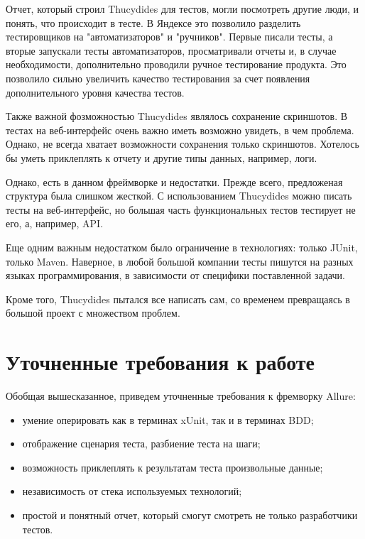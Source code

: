 Отчет, который строил Thucydides для тестов, могли посмотреть другие люди, и понять, что происходит в тесте. В Яндексе это позволило разделить тестировщиков на "автоматизаторов" и "ручников". Первые писали тесты, а вторые запускали тесты автоматизаторов, просматривали отчеты и, в случае необходимости, дополнительно проводили ручное тестирование продукта. Это позволило сильно увеличить качество тестирования за счет появления дополнительного уровня качества тестов.

Также важной фозможностью Thucydides являлось сохранение скриншотов. В тестах на веб-интерфейс очень важно иметь возможно увидеть, в чем проблема. Однако, не всегда хватает возможности сохранения только скриншотов. Хотелось бы уметь приклеплять к отчету и другие типы данных, например, логи.

Однако, есть в данном фреймворке и недостатки. Прежде всего, предложеная структура была слишком жесткой. С использованием Thucydides можно писать тесты на веб-интерфейс, но большая часть функциональных тестов тестирует не его, а, например, API. 

Еще одним важным недостатком было ограничение в технологиях: только JUnit, только Maven. Наверное, в любой большой компании тесты пишутся на разных языках программирования, в зависимости от специфики поставленной задачи. 

Кроме того, Thucydides пытался все написать сам, со временем превращаясь в большой проект с множеством проблем.

\section{Уточненные требования к работе}

Обобщая вышесказанное, приведем уточненные требования к фремворку Allure:

\begin{itemize}
\item умение оперировать как в терминах xUnit, так и в терминах BDD;
\item отображение сценария теста, разбиение теста на шаги;
\item возможность приклеплять к результатам теста произвольные данные;
\item независимость от стека используемых технологий;
\item простой и понятный отчет, который смогут смотреть не только разработчики тестов.
\end{itemize}